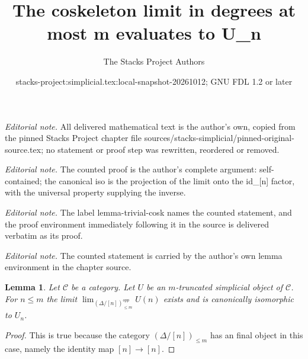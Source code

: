 \documentclass{stacks-project}
\title{The coskeleton limit in degrees at most m evaluates to U\_n}
\author{The Stacks Project Authors}
\date{stacks-project:simplicial.tex:local-snapshot-20261012; GNU FDL 1.2 or later}
\theoremstyle{plain}
\newtheorem{lemma}[subsection]{Lemma}
\theoremstyle{definition}
\theoremstyle{remark}
\numberwithin{equation}{subsection}
\def\lim{\mathop{\mathrm{lim}}\nolimits}
\begin{document}
\maketitle
\noindent\textit{Editorial note.} All delivered mathematical text is the author's own, copied from the pinned Stacks Project chapter file sources/stacks-simplicial/pinned-original-source.tex; no statement or proof step was rewritten, reordered or removed.\par\medskip
\noindent\textit{Editorial note.} The counted proof is the author's complete argument: self-contained; the canonical iso is the projection of the limit onto the id\_[n] factor, with the universal property supplying the inverse.\par\medskip
\noindent\textit{Editorial note.} The label lemma-trivial-cosk names the counted statement, and the proof environment immediately following it in the source is delivered verbatim as its proof.\par\medskip
\noindent\textit{Editorial note.} The counted statement is carried by the author's own lemma environment in the chapter source.\par\medskip
\begin{lemma}
\label{lemma-trivial-cosk}
Let $\mathcal{C}$ be a category.
Let $U$ be an $m$-truncated simplicial object of $\mathcal{C}$.
For $n \leq m$ the limit $\lim_{(\Delta/[n])_{\leq m}^{opp}} U(n)$
exists and is canonically isomorphic to $U_n$.
\end{lemma}

\begin{proof}
This is true because the category $(\Delta/[n])_{\leq m}$
has an final object in this case, namely the identity
map $[n] \to [n]$.
\end{proof}
\end{document}
